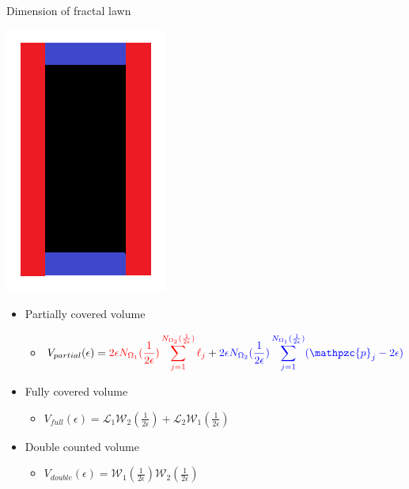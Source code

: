 \documentclass{if-beamer}
\newcommand{\SL}{\mathcal{L}}
\newcommand{\W}{\mathcal{W}}
\newcommand{\p}{\mathpzc{p}}
\begin{document}
\begin{frame}{Dimension of fractal lawn}
	\begin{center}
		\includegraphics[scale=0.25]{VolumeBox.png}
	\end{center}
	
	\begin{itemize}
		\item Partially covered volume
		\begin{itemize}
			\item $\displaystyle V_{partial}(\epsilon)=\textcolor{red}{2\epsilon N_{\Omega_1}(\frac{1}{2\epsilon})\sum_{j=1}^{N_{\Omega_2}(\frac{1}{2\epsilon})} \ell_j} + \textcolor{blue}{2\epsilon N_{\Omega_2}(\frac{1}{2\epsilon})\sum_{j=1}^{N_{\Omega_1}(\frac{1}{2\epsilon})} (\p_j - 2\epsilon)}$
		\end{itemize}
		
		\item Fully covered volume
		\begin{itemize}
			\item $\displaystyle V_{full}(\epsilon)=\SL_1 \W_2(\frac{1}{2\epsilon}) + \SL_2 \W_1(\frac{1}{2\epsilon})$
		\end{itemize}
		
		\item Double counted volume
		\begin{itemize}
			\item $V_{double}(\epsilon)=\W_1(\frac{1}{2\epsilon}) \W_2(\frac{1}{2\epsilon})$
		\end{itemize}
	\end{itemize}
	
\end{frame}
\end{document}
